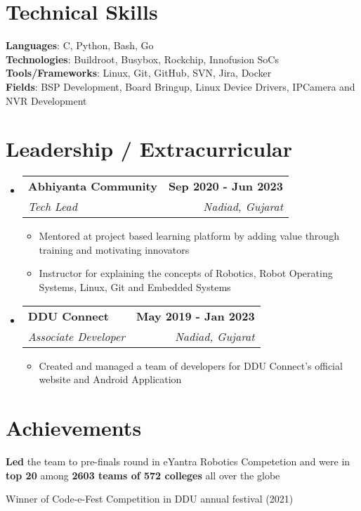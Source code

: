 \documentclass[letterpaper,11pt]{article}
\makeatletter
\newcommand{\resumeItem}[1]{
  \item\small{
    {#1 \vspace{-2pt}}
  }
}
\newcommand{\resumeSubheading}[4]{
  \vspace{-2pt}\item
    \begin{tabular*}{1.0\textwidth}[t]{l@{\extracolsep{\fill}}r}
      \textbf{#1} & \textbf{\small #2} \\
      \textit{\small#3} & \textit{\small #4} \\
    \end{tabular*}\vspace{-7pt}
}
\newcommand{\resumeSubHeadingListStart}{\begin{itemize}[leftmargin=0.0in, label={}]}
\newcommand{\resumeSubHeadingListEnd}{\end{itemize}}
\newcommand{\resumeItemListStart}{\begin{itemize}}
\newcommand{\resumeItemListEnd}{\end{itemize}\vspace{-5pt}}
\makeatother
\begin{document}
%
\section{Technical Skills}
 \begin{itemize}[leftmargin=0.15in, label={}]
    \small{\item{
     \textbf{Languages}{: C, Python, Bash, Go} \\
     \textbf{Technologies}{: Buildroot, Busybox, Rockchip, Innofusion SoCs} \\
     \textbf{Tools/Frameworks}{: Linux, Git, GitHub, SVN, Jira, Docker} \\
     \textbf{Fields}{: BSP Development, Board Bringup, Linux Device Drivers, IPCamera and NVR Development} \\
    }}
 \end{itemize}
 \vspace{-10pt}


\section{Leadership / Extracurricular}
    \resumeSubHeadingListStart
        \resumeSubheading{Abhiyanta Community}{Sep 2020 - Jun 2023}{Tech Lead}{Nadiad, Gujarat}
            \resumeItemListStart
                \resumeItem{Mentored at project based learning platform by adding value through training and motivating innovators}
                \resumeItem{Instructor for explaining the concepts of Robotics, Robot Operating Systems, Linux, Git and Embedded Systems}
            \resumeItemListEnd
        \resumeSubheading{DDU Connect}{May 2019 - Jan 2023}{Associate Developer}{Nadiad, Gujarat}
            \resumeItemListStart
                \resumeItem{Created and managed a team of developers for DDU Connect’s official website and Android Application}
            \resumeItemListEnd
    \resumeSubHeadingListEnd
\vspace{-10pt}

\section{Achievements}
 \begin{itemize}[leftmargin=0.15in]
    \small{\setlength{\itemsep}{-3pt}
        \item{\textbf{Led} the team to pre-finals round in eYantra Robotics Competetion and were in \textbf{top 20} among \textbf{2603 teams of 572 colleges} all over the globe}
        \item{Winner of Code-e-Fest Competition in DDU annual festival (2021)}
    }
 \end{itemize}
\end{document}
